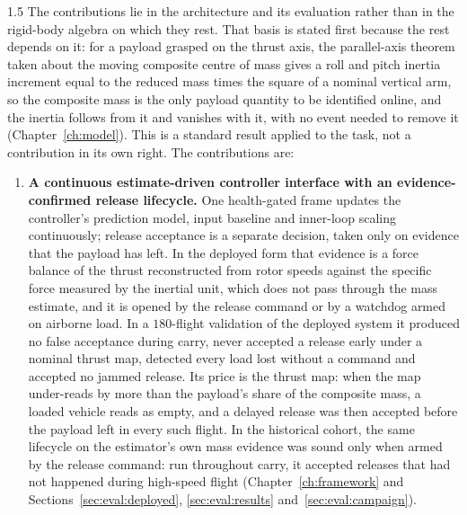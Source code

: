 \begin{spacing}{1.5}
The contributions lie in the architecture and its evaluation rather than in the
rigid-body algebra on which they rest. That basis is stated first because the
rest depends on it: for a payload grasped on the thrust axis, the parallel-axis
theorem taken about the moving composite centre of mass gives a roll and pitch
inertia increment equal to the reduced mass times the square of a nominal
vertical arm, so the composite mass is the only payload quantity to be identified
online, and the inertia follows from it and vanishes with it, with no event
needed to remove it (Chapter~\ref{ch:model}). This is a standard result applied
to the task, not a contribution in its own right. The contributions are:
\begin{enumerate}
\item \textbf{A continuous estimate-driven controller interface with an
evidence-confirmed release lifecycle.} One health-gated frame updates the
controller's prediction model, input baseline and inner-loop scaling
continuously; release acceptance is a separate decision, taken only on evidence
that the payload has left. In the deployed form that evidence is a force balance
of the thrust reconstructed from rotor speeds against the specific force measured
by the inertial unit, which does not pass through the mass estimate, and it is
opened by the release command or by a watchdog armed on airborne load. In a
$180$-flight validation of the deployed system it produced no false acceptance
during carry, never accepted a release early under a nominal thrust map,
detected every load lost without a command and accepted no jammed release. Its
price is the thrust map: when the map under-reads by more than the payload's
share of the composite mass, a loaded vehicle reads as empty, and a delayed
release was then accepted before the payload left in every such flight. In the
historical cohort, the same lifecycle on the estimator's own mass
evidence was sound only when armed by the release command: run throughout carry,
it accepted releases that had not happened during high-speed flight
(Chapter~\ref{ch:framework} and Sections~\ref{sec:eval:deployed},
\ref{sec:eval:results} and~\ref{sec:eval:campaign}).


\end{enumerate}
\end{spacing}
